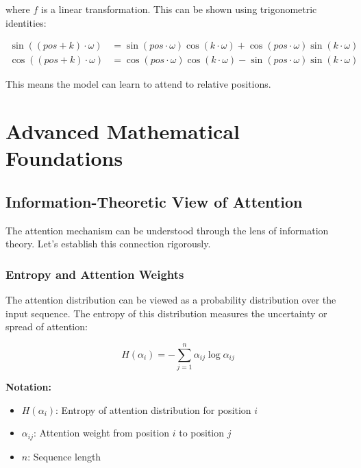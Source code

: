 \documentclass[11pt]{article}
\begin{document}
where $f$ is a linear transformation. This can be shown using trigonometric identities:

\begin{align}
\sin((pos + k) \cdot \omega) &= \sin(pos \cdot \omega)\cos(k \cdot \omega) + \cos(pos \cdot \omega)\sin(k \cdot \omega) \\
\cos((pos + k) \cdot \omega) &= \cos(pos \cdot \omega)\cos(k \cdot \omega) - \sin(pos \cdot \omega)\sin(k \cdot \omega)
\end{align}

This means the model can learn to attend to relative positions.


\section{Advanced Mathematical Foundations}

\subsection{Information-Theoretic View of Attention}

The attention mechanism can be understood through the lens of information theory. Let's establish this connection rigorously.

\subsubsection{Entropy and Attention Weights}

The attention distribution can be viewed as a probability distribution over the input sequence. The entropy of this distribution measures the uncertainty or spread of attention:

\begin{equation}
H(\alpha_i) = -\sum_{j=1}^{n} \alpha_{ij} \log \alpha_{ij}
\end{equation}

\begin{notationbox}
\textbf{Notation:}
\begin{itemize}
    \item $H(\alpha_i)$: Entropy of attention distribution for position $i$
    \item $\alpha_{ij}$: Attention weight from position $i$ to position $j$
    \item $n$: Sequence length
\end{itemize}
\end{notationbox}
\end{document}
